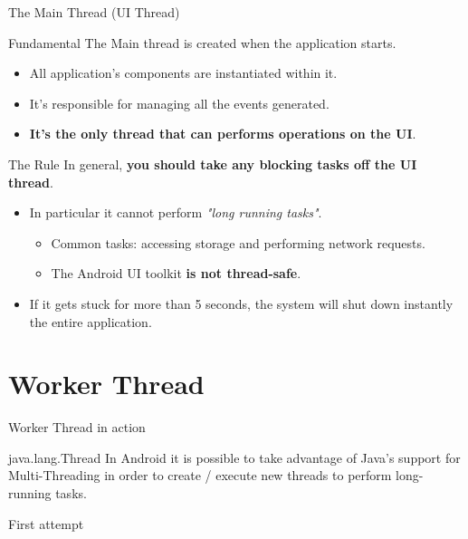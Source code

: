 \documentclass{beamer}
\begin{document}
\begin{frame}{The Main Thread (UI Thread)}
  \begin{block}{Fundamental}
    The Main thread is created when the application starts.
    \begin{itemize}
      \item All application's components are instantiated within it.
      \item It's responsible for managing all the events generated.
      \item \textbf{It's the only thread that can performs operations on the UI}. 
    \end{itemize}
  \end{block}
  \begin{block}{The Rule}
   In general, \textbf{you should take any blocking tasks off the UI thread}.
   \begin{itemize}
    \item In particular it cannot perform \textit{"long running tasks"}.
    \begin{itemize}
      \item Common tasks: accessing storage and performing network requests.
      \item The Android UI toolkit \textbf{is not thread-safe}.
    \end{itemize}
    \item If it gets stuck for more than 5 seconds, the system will shut down
    instantly the entire application.
   \end{itemize} 
  \end{block}
\end{frame}

\section{Worker Thread}

  \begin{frame}[fragile]{Worker Thread in action}
    \begin{block}{java.lang.Thread}
      In Android it is possible to take advantage of Java's support for
      Multi-Threading in order to create / execute new threads to perform
      long-running tasks.
    \end{block}
    \begin{exampleblock}{First attempt}
      
    \end{exampleblock}
  \end{frame}
\end{document}
